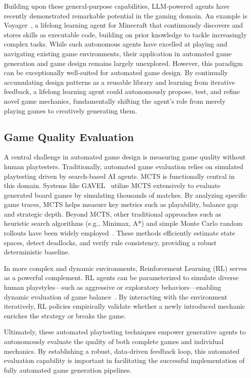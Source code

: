 \documentclass[conference]{IEEEtran}
\begin{document}
Building upon these general-purpose capabilities, LLM-powered agents have recently demonstrated remarkable potential in the gaming domain. An example is Voyager~\cite{wang2023voyager}, a lifelong learning agent for Minecraft that continuously discovers and stores skills as executable code, building on prior knowledge to tackle increasingly complex tasks. While such autonomous agents have excelled at playing and navigating existing game environments, their application in automated game generation and game design remains largely unexplored. However, this paradigm can be exceptionally well-suited for automated game design. By continually accumulating design patterns as a reusable library and learning from iterative feedback, a lifelong learning agent could autonomously propose, test, and refine novel game mechanics, fundamentally shifting the agent's role from merely playing games to creatively generating them.

\subsection{Game Quality Evaluation}
A central challenge in automated game design is measuring game quality without human playtesters. Traditionally, automated game evaluation relies on simulated playtesting driven by search-based AI agents. MCTS is functionally central in this domain. Systems like GAVEL~\cite{todd2024gavel} utilize MCTS extensively to evaluate generated board games by simulating thousands of matches. By analyzing specific game traces, MCTS helps measure key metrics such as playability, balance gap and strategic depth. Beyond MCTS, other traditional approaches such as heuristic search algorithms (e.g., Minimax, A*) and simple Monte Carlo random rollouts have been widely employed~\cite{browne2010evolutionary,horn2014comparative}. These methods efficiently estimate state spaces, detect deadlocks, and verify rule consistency, providing a robust deterministic baseline.

In more complex and dynamic environments, Reinforcement Learning (RL) serves as a powerful complement. RL agents can be parameterized to simulate diverse human playstyles—such as aggressive or exploratory behaviors—enabling dynamic evaluation of game balance~\cite{bergdahl2020augmenting}. By interacting with the environment iteratively, RL policies empirically validate whether a newly introduced mechanic enriches the strategy or breaks the game. 

Ultimately, these automated playtesting techniques empower generative agents to autonomously evaluate the quality of both complete games and individual mechanics. By establishing a robust, data-driven feedback loop, this automated evaluation capability is important in facilitating the successful implementation of fully automated game generation pipelines.
\end{document}
